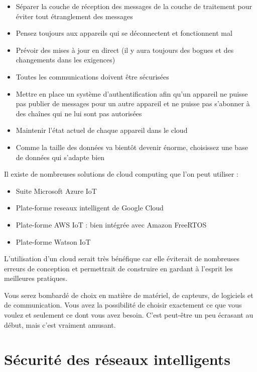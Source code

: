 \documentclass[12pt]{report}
\begin{document}
\begin{itemize}
      \item
            Séparer la couche de réception des messages de la couche de traitement
            pour éviter tout étranglement des messages
      \item
            Pensez toujours aux appareils qui se déconnectent et fonctionnent mal
      \item
            Prévoir des mises à jour en direct (il y aura toujours des bogues et
            des changements dans les exigences)
      \item
            Toutes les communications doivent être sécurisées
      \item
            Mettre en place un système d'authentification afin qu'un appareil ne
            puisse pas publier de messages pour un autre appareil et ne puisse pas
            s'abonner à des chaînes qui ne lui sont pas autorisées
      \item
            Maintenir l'état actuel de chaque appareil dans le cloud
      \item
            Comme la taille des données va bientôt devenir énorme, choisissez une
            base de données qui s'adapte bien
\end{itemize}

Il existe de nombreuses solutions de cloud computing que l'on peut
utiliser :

\begin{itemize}
      \item
            Suite Microsoft Azure IoT
      \item
            Plate-forme reseaux intelligent de Google Cloud
      \item
            Plate-forme AWS IoT : bien intégrée avec Amazon FreeRTOS
      \item
            Plate-forme Watson IoT
\end{itemize}

L'utilisation d'un cloud serait très bénéfique car elle éviterait de
nombreuses erreurs de conception et permettrait de construire en gardant
à l'esprit les meilleures pratiques.

Vous serez bombardé de choix en matière de matériel, de capteurs, de
logiciels et de communication. Vous avez la possibilité de choisir
exactement ce que vous voulez et seulement ce dont vous avez besoin.
C'est peut-être un peu écrasant au début, mais c'est vraiment amusant.

\hypertarget{suxe9curituxe9-des-ruxe9seaux-intelligents}{%
      \chapter{\texorpdfstring{Sécurité des réseaux intelligents
        }{Sécurité des réseaux intelligents }}\label{suxe9curituxe9-des-ruxe9seaux-intelligents}}
\end{document}
